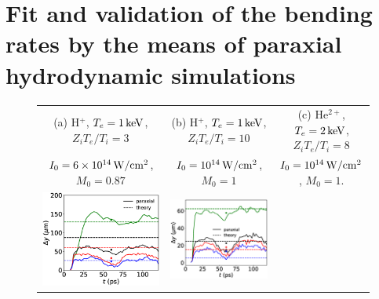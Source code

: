 \documentclass[%
 reprint,
 amsmath,amssymb,
 aps,
]{revtex4-1}
\begin{document}
\section{Fit and validation of the bending rates by the means of paraxial hydrodynamic simulations }
\label{sec:parax}
\begin{figure}
\begin{tabular}{ccc}
(a) H$^+$, $T_e=1\, \rm keV$,  $Z_iT_e/T_i=3$ & (b) H$^+$, $T_e=1\, \rm keV$,  $Z_iT_e/T_i=10$&(c) He$^{2+}$, $T_e=2\, \rm keV$, $Z_iT_e/T_i=8$\\
$I_0=6\times 10^{14}\, \rm W/cm^2$,  $M_0=0.87$ &$I_0=10^{14}\, \rm W/cm^2$,  $M_0=1$  &$I_0=10^{14}\, \rm W/cm^2$,  $M_0=1.$ \\
\includegraphics[scale=0.32]{Fig2a.eps}&
\includegraphics[scale=0.32]{Fig2b.eps}&

\end{tabular}
\end{figure}
\end{document}
